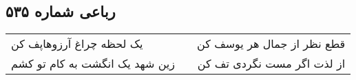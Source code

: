 \begin{center}
\section*{رباعی شماره ۵۳۵}
\label{sec:sh535}
\begin{longtable}{l p{0.5cm} r}
یک لحظه چراغ آرزوهاپف کن
&&
قطع نظر از جمال هر یوسف کن
\\
زین شهد یک انگشت به کام تو کشم
&&
از لذت اگر مست نگردی تف کن
\\
\end{longtable}
\end{center}
